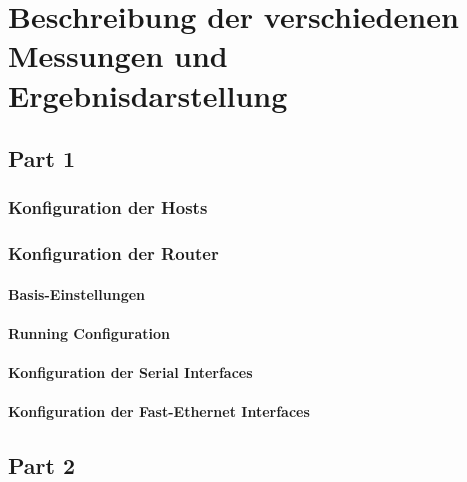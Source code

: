 \chapter{Beschreibung der verschiedenen Messungen und Ergebnisdarstellung}

\section{Part 1}


\subsection{Konfiguration der Hosts}

\subsection{Konfiguration der Router}

\subsubsection{Basis-Einstellungen}

\subsubsection{Running Configuration}

\subsubsection{Konfiguration der Serial Interfaces}

\subsubsection{Konfiguration der Fast-Ethernet Interfaces}




\section{Part 2}